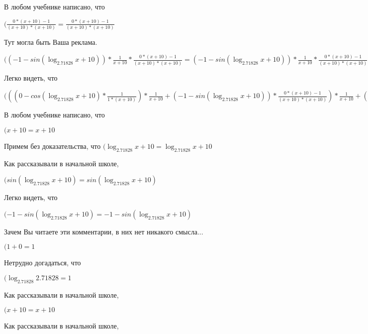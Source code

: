 \documentclass[12pt,a4paper,fleqn]{article}
\theoremstyle{definition}
\begin{document}
В любом учебнике написано, что

$(\frac{ 0  * ( x  +  10 ) -  1 }{( x  +  10 ) * ( x  +  10 )}
 = \frac{ 0  * ( x  +  10 ) -  1 }{( x  +  10 ) * ( x  +  10 )}
$

Тут могла быть Ваша реклама.

$(( -1  - sin(\log_{ 2.71828 }{ x  +  10 })) * \frac{ 1 }{ x  +  10 }
 * \frac{ 0  * ( x  +  10 ) -  1 }{( x  +  10 ) * ( x  +  10 )}
 = ( -1  - sin(\log_{ 2.71828 }{ x  +  10 })) * \frac{ 1 }{ x  +  10 }
 * \frac{ 0  * ( x  +  10 ) -  1 }{( x  +  10 ) * ( x  +  10 )}
$

Легко видеть, что

$((( 0  - cos(\log_{ 2.71828 }{ x  +  10 }) * \frac{ 1 }{ 1  * ( x  +  10 )}
) * \frac{ 1 }{ x  +  10 }
 + ( -1  - sin(\log_{ 2.71828 }{ x  +  10 })) * \frac{ 0  * ( x  +  10 ) -  1 }{( x  +  10 ) * ( x  +  10 )}
) * \frac{ 1 }{ x  +  10 }
 + ( -1  - sin(\log_{ 2.71828 }{ x  +  10 })) * \frac{ 1 }{ x  +  10 }
 * \frac{ 0  * ( x  +  10 ) -  1 }{( x  +  10 ) * ( x  +  10 )}
 = (( 0  - cos(\log_{ 2.71828 }{ x  +  10 }) * \frac{ 1 }{ 1  * ( x  +  10 )}
) * \frac{ 1 }{ x  +  10 }
 + ( -1  - sin(\log_{ 2.71828 }{ x  +  10 })) * \frac{ 0  * ( x  +  10 ) -  1 }{( x  +  10 ) * ( x  +  10 )}
) * \frac{ 1 }{ x  +  10 }
 + ( -1  - sin(\log_{ 2.71828 }{ x  +  10 })) * \frac{ 1 }{ x  +  10 }
 * \frac{ 0  * ( x  +  10 ) -  1 }{( x  +  10 ) * ( x  +  10 )}
$

В любом учебнике написано, что

$( x  +  10  =  x  +  10 $

Примем без доказательства, что
$(\log_{ 2.71828 }{ x  +  10 } = \log_{ 2.71828 }{ x  +  10 }$

Как рассказывали в начальной школе,

$(sin(\log_{ 2.71828 }{ x  +  10 }) = sin(\log_{ 2.71828 }{ x  +  10 })$

Легко видеть, что

$( -1  - sin(\log_{ 2.71828 }{ x  +  10 }) =  -1  - sin(\log_{ 2.71828 }{ x  +  10 })$

Зачем Вы читаете эти комментарии, в них нет никакого смысла...

$( 1  +  0  =  1 $

Нетрудно догадаться, что

$(\log_{ 2.71828 }{ 2.71828 } =  1 $

Как рассказывали в начальной школе,

$( x  +  10  =  x  +  10 $

Как рассказывали в начальной школе,
\end{document}
